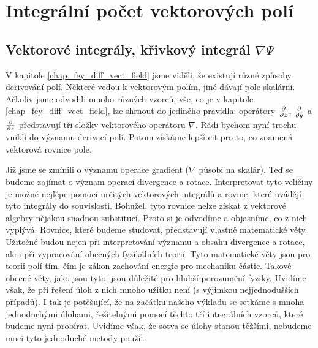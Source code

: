 {
\chapter{Integrální počet vektorových polí}\label{chap:fey_int_vec_field}
\minitoc

  \section{Vektorové integrály, křivkový integrál \texorpdfstring{\(\nabla\Psi\)}{nabla psi}}
    V kapitole \ref{chap_fey_diff_vect_field} jsme viděli, že existují různé způsoby derivování 
    polí. Některé vedou k vektorovým polím, jiné dávají pole skalární. Ačkoliv jsme odvodili mnoho 
    různých vzorců, vše, co je v kapitole \ref{chap_fey_diff_vect_field}, lze shrnout do jediného 
    pravidla: operátory \(\frac{\partial  }{\partial x}\), \(\frac{\partial  }{\partial y}\) a \(\frac{\partial  }{\partial z}\) představují tři složky 
    vektorového operátoru \(\nabla\). Rádi bychom nyní trochu vnikli do významu derivací polí. 
    Potom získáme lepší cit pro to, co znamená vektorová rovnice pole.
    
    Již jsme se zmínili o významu operace gradient (\(\nabla\) působí na skalár). Teď se budeme  
    zajímat o význam operací divergence a rotace. Interpretovat tyto veličiny je možné nejlépe 
    pomocí určitých vektorových integrálů a rovnic, které uvádějí tyto integrály do souvislosti. 
    Bohužel, tyto rovnice nelze získat z vektorové algebry nějakou snadnou substitucí. Proto si je 
    odvodíme a objasníme, co z nich vyplývá. Rovnice, které budeme studovat, představují vlastně 
    matematické věty. Užitečné budou nejen při interpretování významu a obsahu divergence a rotace, 
    ale i při vypracování obecných fyzikálních teorií. Tyto matematické věty jsou pro teorii polí 
    tím, čím je zákon zachování energie pro mechaniku částic. Takové obecné věty, jako jsou tyto, 
    jsou důležité pro hlubší porozumění fyziky. Uvidíme však, že při řešení úloh z nich mnoho 
    užitku není (s výjimkou nejjednodušších případů). I tak je potěšující, že na začátku našeho 
    výkladu se setkáme s mnoha jednoduchými úlohami, řešitelnými pomocí těchto tří integrálních 
    vzorců, které budeme nyní probírat. Uvidíme však, že sotva se úlohy stanou těžšími, nebudeme 
    moci tyto jednoduché metody použít.
    
}
